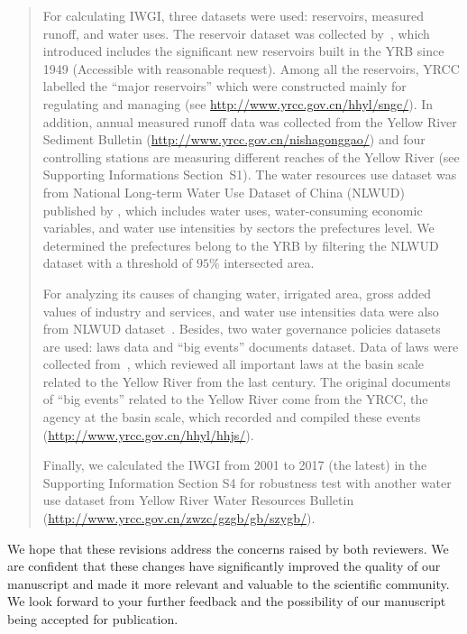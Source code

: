 \begin{quote}
	For calculating IWGI, three datasets were used: reservoirs, measured runoff, and water uses.
	The reservoir dataset was collected by~, which introduced includes the significant new reservoirs built in the YRB since 1949 (Accessible with reasonable request).
	Among all the reservoirs, YRCC labelled the ``major reservoirs'' which were constructed mainly for regulating and managing (see \url{http://www.yrcc.gov.cn/hhyl/sngc/}).
	In addition, annual measured runoff data was collected from the Yellow River Sediment Bulletin (\url{http://www.yrcc.gov.cn/nishagonggao/}) and four controlling stations are measuring different reaches of the Yellow River (see Supporting Informations Section~S1).
	The water resources use dataset was from National Long-term Water Use Dataset of China (NLWUD) published by , which includes water uses, water-consuming economic variables, and water use intensities by sectors the prefectures level.
	We determined the prefectures belong to the YRB by filtering the NLWUD dataset with a threshold of $95\%$ intersected area.

	For analyzing its causes of changing water, irrigated area, gross added values of industry and services, and water use intensities data were also from NLWUD dataset~\cite{zhou2020}.
	Besides, two water governance policies datasets are used: laws data and ``big events'' documents dataset.
	Data of laws were collected from~, which reviewed all important laws at the basin scale related to the Yellow River from the last century.
	The original documents of ``big events'' related to the Yellow River come from the YRCC, the agency at the basin scale, which recorded and compiled these events (\url{http://www.yrcc.gov.cn/hhyl/hhjs/}).

	Finally, we calculated the IWGI from 2001 to 2017 (the latest) in the Supporting Information Section S4 for robustness test with another water use dataset from Yellow River Water Resources Bulletin (\url{http://www.yrcc.gov.cn/zwzc/gzgb/gb/szygb/}).
\end{quote}

\AR*{} We hope that these revisions address the concerns raised by both reviewers. We are confident that these changes have significantly improved the quality of our manuscript and made it more relevant and valuable to the scientific community. We look forward to your further feedback and the possibility of our manuscript being accepted for publication.
